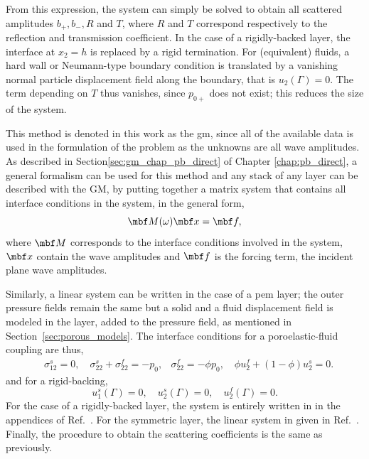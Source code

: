 From this expression, the system can simply be solved to obtain all scattered amplitudes $b_+, b_-, R$ and $T$, where $R$ and $T$ correspond respectively to the reflection and transmission coefficient. In the case of a rigidly-backed layer, the interface at $x_2=h$ is replaced by a rigid termination. For (equivalent) fluids, a hard wall or Neumann-type boundary condition is translated by a vanishing normal particle displacement field along the boundary, that is $u_2(\Gamma) = 0$. The term depending on $T$ thus vanishes, since $p_{0+}$ does not exist; this reduces the size of the system.

This method is denoted in this work as the \acrfull{gm}, since all of the available data is used in the formulation of the problem as the unknowns are all wave amplitudes. As described in Section\ref{sec:gm_chap_pb_direct} of Chapter \ref{chap:pb_direct}, a general formalism can be used for this method and any stack of any layer can be described with the GM, by putting together a matrix system that contains all interface conditions in the system, in the general form,
\begin{equation}
    \mbf M(\omega) \mbf x = \mbf f,
    \label{eq:sys_gm}
\end{equation}
where $\mbf M$ corresponds to the interface conditions involved in the system, $\mbf x$ contain the wave amplitudes and $\mbf f$ is the forcing term, the incident plane wave amplitudes. 

Similarly, a linear system can be written in the case of a \acrshort{pem} layer; the outer pressure fields remain the same but a solid and a fluid displacement field is modeled in the layer, added to the pressure field, as mentioned in Section~\ref{sec:porous_models}. The interface conditions for a poroelastic-fluid coupling are thus, 
\begin{equation}
\begin{aligned}&\sigma_{12}^{s}=0,\quad\sigma_{22}^{s}+\sigma_{22}^{f}=-p_0,&\sigma_{22}^{f}=-\phi p_0, \quad\phi u^f_{2}+(1-\phi)u^s_{2}=0.\end{aligned}\end{equation}
and for a rigid-backing, 
\begin{equation}
    u^s_1(\Gamma) = 0, \quad u^s_2(\Gamma) = 0, \quad u^f_2(\Gamma) = 0.
\end{equation}
For the case of a rigidly-backed layer, the system is entirely written in in the appendices of Ref.~\cite{weisser2016}. For the symmetric layer, the linear system in given in Ref.~\cite{boeckx2005}. Finally, the procedure to obtain the scattering coefficients is the same as previously. 

